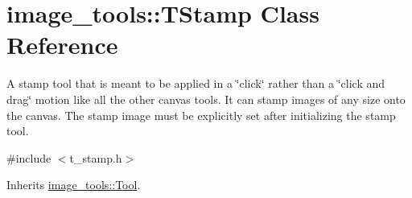 \hypertarget{classimage__tools_1_1TStamp}{}\section{image\+\_\+tools\+:\+:T\+Stamp Class Reference}
\label{classimage__tools_1_1TStamp}


A stamp tool that is meant to be applied in a \char`\"{}click\char`\"{} rather than a \char`\"{}click and drag\char`\"{} motion like all the other canvas tools. It can stamp images of any size onto the canvas. The stamp image must be explicitly set after initializing the stamp tool.  




{\ttfamily \#include $<$t\+\_\+stamp.\+h$>$}



Inherits \hyperlink{classimage__tools_1_1Tool}{image\+\_\+tools\+::\+Tool}.

